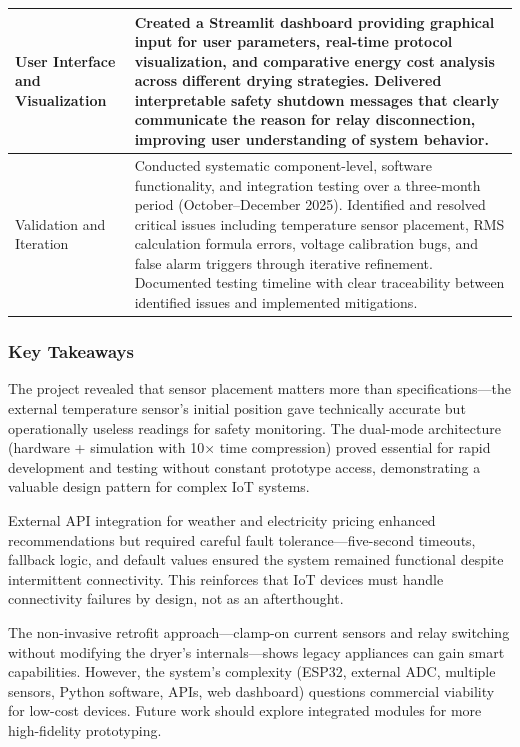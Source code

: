 \documentclass[11pt,a4paper]{article}
\begin{document}
\begin{longtable}{|p{}|p{}|}
\hline
User Interface and Visualization & Created a Streamlit dashboard providing graphical input for user parameters, real-time protocol visualization, and comparative energy cost analysis across different drying strategies. Delivered interpretable safety shutdown messages that clearly communicate the reason for relay disconnection, improving user understanding of system behavior. \\
\hline
Validation and Iteration & Conducted systematic component-level, software functionality, and integration testing over a three-month period (October--December 2025). Identified and resolved critical issues including temperature sensor placement, RMS calculation formula errors, voltage calibration bugs, and false alarm triggers through iterative refinement. Documented testing timeline with clear traceability between identified issues and implemented mitigations. \\
\hline
\end{longtable}

\subsubsection*{Key Takeaways}

The project revealed that sensor placement matters more than specifications—the external temperature sensor's initial position gave technically accurate but operationally useless readings for safety monitoring. The dual-mode architecture (hardware + simulation with 10× time compression) proved essential for rapid development and testing without constant prototype access, demonstrating a valuable design pattern for complex IoT systems.

External API integration for weather and electricity pricing enhanced recommendations but required careful fault tolerance—five-second timeouts, fallback logic, and default values ensured the system remained functional despite intermittent connectivity. This reinforces that IoT devices must handle connectivity failures by design, not as an afterthought.

The non-invasive retrofit approach—clamp-on current sensors and relay switching without modifying the dryer's internals—shows legacy appliances can gain smart capabilities. However, the system's complexity (ESP32, external ADC, multiple sensors, Python software, APIs, web dashboard) questions commercial viability for low-cost devices. Future work should explore integrated modules for more high-fidelity prototyping.



\newpage


\end{document}
